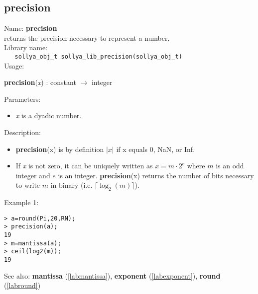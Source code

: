 \subsection{precision}
\label{labprecision}
\noindent Name: \textbf{precision}\\
\phantom{aaa}returns the precision necessary to represent a number.\\[0.2cm]
\noindent Library name:\\
\verb|   sollya_obj_t sollya_lib_precision(sollya_obj_t)|\\[0.2cm]
\noindent Usage: 
\begin{center}
\textbf{precision}(\emph{x}) : \textsf{constant} $\rightarrow$ \textsf{integer}\\
\end{center}
Parameters: 
\begin{itemize}
\item \emph{x} is a dyadic number.
\end{itemize}
\noindent Description: \begin{itemize}

\item \textbf{precision}(x) is by definition $\vert x \vert$ if x equals 0, NaN, or Inf.

\item If \emph{x} is not zero, it can be uniquely written as $x = m \cdot 2^e$ where
   $m$ is an odd integer and $e$ is an integer. \textbf{precision}(x) returns the number
   of bits necessary to write $m$ in binary (i.e. $\lceil \log_2(m) \rceil$).
\end{itemize}
\noindent Example 1: 
\begin{center}\begin{minipage}{15cm}\begin{Verbatim}[frame=single]
> a=round(Pi,20,RN);
> precision(a);
19
> m=mantissa(a);
> ceil(log2(m));
19
\end{Verbatim}
\end{minipage}\end{center}
See also: \textbf{mantissa} (\ref{labmantissa}), \textbf{exponent} (\ref{labexponent}), \textbf{round} (\ref{labround})
